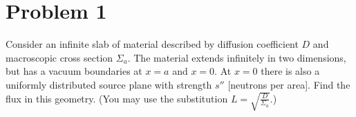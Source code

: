 \section*{Problem 1}

Consider an infinite slab of material described by diffusion coefficient $D$ and macroscopic cross section $\Sigma_a$. 
The material extends infinitely in two dimensions, but has a vacuum boundaries at $x=a$ and $x=0$. 
At $x=0$ there is also a uniformly distributed source plane with strength $s''$ [neutrons per area]. 
Find the flux in this geometry. 
(You may use the substitution $L = \sqrt{\frac{D}{\Sigma_a}}$.)

